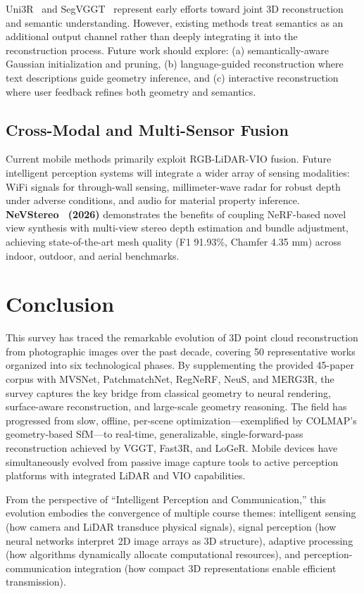 \documentclass[journal]{IEEEtran}
\begin{document}
Uni3R~\cite{uni3r} and SegVGGT~\cite{segvggt} represent early efforts toward joint 3D reconstruction and semantic understanding. However, existing methods treat semantics as an additional output channel rather than deeply integrating it into the reconstruction process. Future work should explore: (a) semantically-aware Gaussian initialization and pruning, (b) language-guided reconstruction where text descriptions guide geometry inference, and (c) interactive reconstruction where user feedback refines both geometry and semantics.

\subsection{Cross-Modal and Multi-Sensor Fusion}

Current mobile methods primarily exploit RGB-LiDAR-VIO fusion. Future intelligent perception systems will integrate a wider array of sensing modalities: WiFi signals for through-wall sensing, millimeter-wave radar for robust depth under adverse conditions, and audio for material property inference. \textbf{NeVStereo~\cite{nevstereo} (2026)} demonstrates the benefits of coupling NeRF-based novel view synthesis with multi-view stereo depth estimation and bundle adjustment, achieving state-of-the-art mesh quality (F1 91.93\%, Chamfer 4.35 mm) across indoor, outdoor, and aerial benchmarks.

\section{Conclusion}
\label{sec:conclusion}

This survey has traced the remarkable evolution of 3D point cloud reconstruction from photographic images over the past decade, covering 50 representative works organized into six technological phases. By supplementing the provided 45-paper corpus with MVSNet, PatchmatchNet, RegNeRF, NeuS, and MERG3R, the survey captures the key bridge from classical geometry to neural rendering, surface-aware reconstruction, and large-scale geometry reasoning. The field has progressed from slow, offline, per-scene optimization---exemplified by COLMAP's geometry-based SfM---to real-time, generalizable, single-forward-pass reconstruction achieved by VGGT, Fast3R, and LoGeR. Mobile devices have simultaneously evolved from passive image capture tools to active perception platforms with integrated LiDAR and VIO capabilities.

From the perspective of ``Intelligent Perception and Communication,'' this evolution embodies the convergence of multiple course themes: intelligent sensing (how camera and LiDAR transduce physical signals), signal perception (how neural networks interpret 2D image arrays as 3D structure), adaptive processing (how algorithms dynamically allocate computational resources), and perception-communication integration (how compact 3D representations enable efficient transmission).
\end{document}
